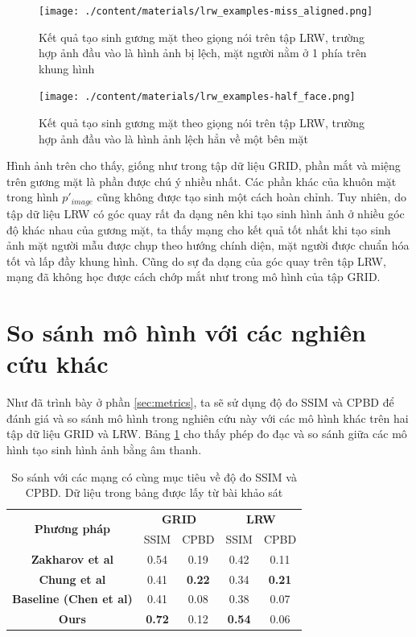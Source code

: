 \begin{figure}[H]
    \centering
    \texttt{[image: ./content/materials/lrw\_examples-miss\_aligned.png]}
    \caption{Kết quả tạo sinh gương mặt theo giọng nói trên tập LRW, trường hợp ảnh đầu vào là hình ảnh bị lệch, mặt người nằm ở 1 phía trên khung hình}
\end{figure}

\begin{figure}[H]
    \centering
    \texttt{[image: ./content/materials/lrw\_examples-half\_face.png]}
    \caption{Kết quả tạo sinh gương mặt theo giọng nói trên tập LRW, trường hợp ảnh đầu vào là hình ảnh lệch hẳn về một bên mặt}
\end{figure}

Hình ảnh trên cho thấy, giống như trong tập dữ liệu GRID, phần mắt và miệng trên gương mặt là phần được chú ý nhiều nhất. Các phần khác của khuôn mặt trong hình  $p'_{image}$ cũng không được tạo sinh một cách hoàn chỉnh. Tuy nhiên, do tập dữ liệu LRW có góc quay rất đa dạng nên khi tạo sinh hình ảnh ở nhiều góc độ khác nhau của gương mặt, ta thấy mạng cho kết quả tốt nhất khi tạo sinh ảnh mặt người mẫu được chụp theo hướng chính diện, mặt người được chuẩn hóa tốt và lấp đầy khung hình. Cũng do sự đa dạng của góc quay trên tập LRW, mạng đã không học được cách chớp mắt như trong mô hình của tập GRID.

\section{So sánh mô hình với các nghiên cứu khác}

Như đã trình bày ở phần \ref{sec:metrics}, ta sẽ sử dụng độ đo SSIM và CPBD để đánh giá và so sánh mô hình trong nghiên cứu này với các mô hình khác trên hai tập dữ liệu GRID và LRW. Bảng \ref{table:metrics_result} cho thấy phép đo đạc và so sánh giữa các mô hình tạo sinh hình ảnh bằng âm thanh.

\begin{table}[h]
    \centering
    \begin{tabular}{c | c | c | c | c}
    \hline 
    \multirow{2}{*}{\textbf{Phương pháp}} & \multicolumn{2}{c|}{\textbf{GRID}} & \multicolumn{2}{c}{\textbf{LRW}}\\
    \cline{2-5}
    & SSIM & CPBD & SSIM & CPBD\\
    \hline
    \textbf{Zakharov et al \cite{zakharov}} & 0.54 & 0.19 & 0.42 & 0.11 \\
    \textbf{Chung et al \cite{chung}} & 0.41 & \textbf{0.22} & 0.34 & \textbf{0.21} \\
    \textbf{Baseline (Chen et al) \cite{chen2019}} & 0.41 & 0.08 & 0.38 & 0.07 \\
    \hline
    \hline
    \textbf{Ours} & \textbf{0.72} & 0.12 & \textbf{0.54} & 0.06 \\
    \hline
    \end{tabular}
    \caption{So sánh với các mạng có cùng mục tiêu về độ đo SSIM và CPBD. Dữ liệu trong bảng được lấy từ bài khảo sát \cite{chen_survey}}
    \label{table:metrics_result}
\end{table}

